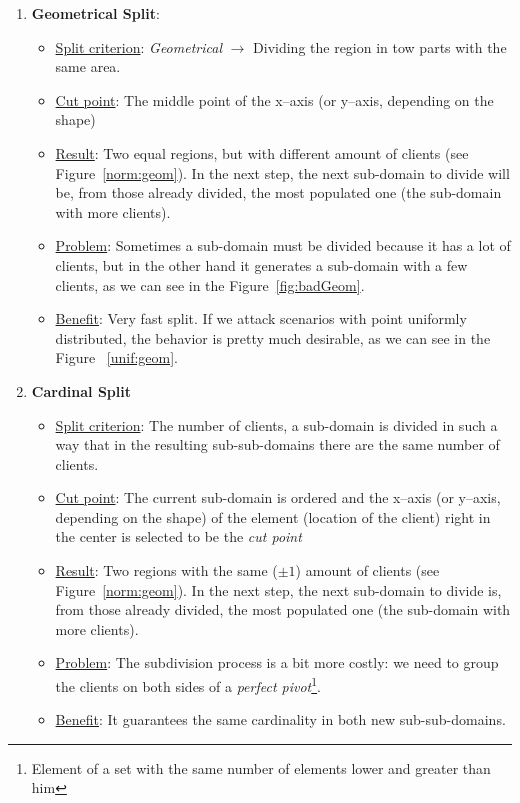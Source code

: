 \begin{enumerate}
\item {\bf Geometrical Split}: 
\begin{itemize}
\item \underline{Split criterion}: {\it Geometrical} $\rightarrow$ Dividing the region in tow parts with the same area.
\item \underline{Cut point}: The middle point of the x--axis (or y--axis, depending on the shape)
\item \underline{Result}: Two equal regions, but with different amount of clients (see Figure~\ref{norm:geom}). In the next step, the next sub-domain to divide will be, from those already divided, the most populated one (the sub-domain with more clients).
\item \underline{Problem}: Sometimes a sub-domain must be divided because it has a lot of clients, but in the other hand it generates a sub-domain with a few clients, as we can see in the Figure~\ref{fig:badGeom}.
\item \underline{Benefit}: Very fast split. If we attack scenarios with point uniformly distributed, the behavior is pretty much desirable, as we can see in the Figure ~\ref{unif:geom}. 
\end{itemize}

\item {\bf Cardinal Split}
\begin{itemize}
\item \underline{Split criterion}: The number of clients, \ie a sub-domain is divided in such a way that in the resulting sub-sub-domains there are the same number of clients.
\item \underline{Cut point}: The current sub-domain is ordered and the x--axis (or y--axis, depending on the shape) of the element (location of the client) right in the center is selected to be the {\it cut point}
\item \underline{Result}: Two regions with the same ($\pm 1$) amount of clients (see Figure~\ref{norm:geom}). In the next step, the next sub-domain to divide is, from those already divided, the most populated one (the sub-domain with more clients).
\item \underline{Problem}: The subdivision process is a bit more costly: we need to group the clients on both sides of a {\it perfect pivot}\footnote{Element of a set with the same number of elements lower and greater than him}.
\item \underline{Benefit}: It guarantees the same cardinality in both new sub-sub-domains.
\end{itemize}


\end{enumerate}

